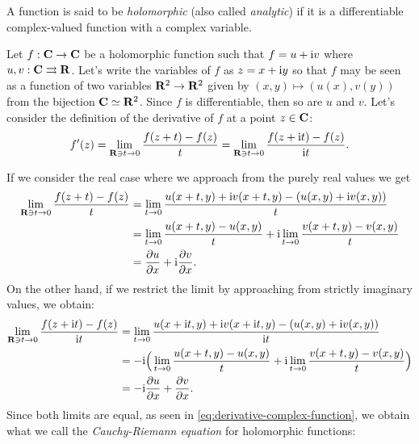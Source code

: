 \begin{definition}
\label{def:holomorphic-function}
    A function is said to be \emph{holomorphic} (also called \emph{analytic})
    if it is a differentiable complex-valued function with a complex variable.
\end{definition}

Let \(f: \mathbf{C} \to \mathbf{C}\) be a holomorphic function such that \(f = u + \text{i} v\) where 
\(u, v: \mathbf{C} \rightrightarrows \mathbf{R}\). Let's write the variables of \(f\) as \(z = x + \text{i} y\) so that \(f\) may
be seen as a function of two variables \(\mathbf{R}^2 \to \mathbf{R}^2\) given by \((x, y) \mapsto (u(x), v(y))\)
from the bijection \(\mathbf{C} \simeq \mathbf{R}^2\). Since \(f\) is differentiable, then so are \(u\) and \(v\).
Let's consider the definition of the derivative of \(f\) at a point \(z \in \mathbf{C}\):
\begin{equation}\label{eq:derivative-complex-function}
    f'(z) = \lim_{\mathbf{R} \ni t \to 0} \frac{f(z + t) - f(z)}{t} 
    = \lim_{\mathbf{R} \ni t \to 0} \frac{f(z + \text{i} t) - f(z)}{\text{i} t}.
\end{equation}

If we consider the real case where we approach from the purely real values we get
\begin{align*}
    \lim_{\mathbf{R} \ni t \to 0} \frac{f(z + t) - f(z)}{t}
    &= \lim_{t \to 0} \frac{u(x + t, y) + \text{i} v(x + t, y) - (u(x, y) + \text{i} v(x, y))}{t} \\
    &= \lim_{t \to 0} \frac{u(x + t, y) - u(x, y)}{t} 
       + \text{i} \lim_{t \to 0} \frac{v(x + t, y) - v(x, y)}{t} \\
    &= \frac{\partial u}{\partial x} + \text{i} \frac{\partial v}{\partial x}.
\end{align*}
On the other hand, if we restrict the limit by approaching from strictly imaginary values, we obtain:
\begin{align*}
    \lim_{\mathbf{R} \ni t \to 0} \frac{f(z + \text{i} t) - f(z)}{\text{i} t}
    &= \lim_{t \to 0} \frac{u(x + \text{i} t, y) + \text{i} v(x + \text{i} t, y) - (u(x, y) + \text{i} v(x, y))}{\text{i} t} \\
    &= -\text{i} \Big(
        \lim_{t \to 0} \frac{u(x + t, y) - u(x, y)}{t} 
       + \text{i} \lim_{t \to 0} \frac{v(x + t, y) - v(x, y)}{t}
    \Big) \\
    &= -\text{i} \frac{\partial u}{\partial x} + \frac{\partial v}{\partial x}.
\end{align*}
Since both limits are equal, as seen in \cref{eq:derivative-complex-function}, we obtain what we
call the \emph{Cauchy-Riemann equation} for holomorphic functions:

